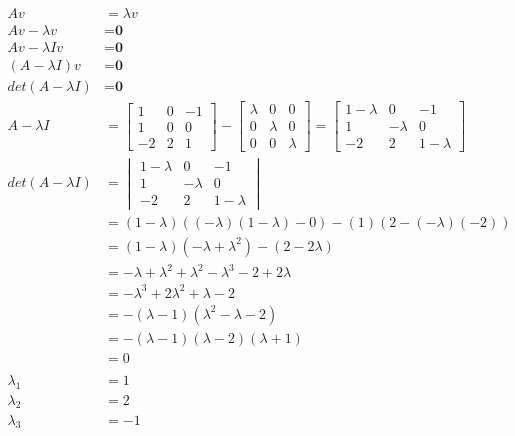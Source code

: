 \documentclass[12pt, border = 4pt, multi]{article} %
\begin{document}
\begin{align*}
Av &= \lambda v\\
Av - \lambda v &= \textbf{0}\\
Av - \lambda I v &= \textbf{0}\\
(A - \lambda I)v &= \textbf{0}\\
det(A - \lambda I) &= \textbf{0}\\
A - \lambda I &=
\begin{bmatrix}
1 & 0 & -1\\ 
1 & 0 & 0\\
-2 & 2 & 1
\end{bmatrix}
-
\begin{bmatrix}
\lambda & 0 & 0\\
0 & \lambda & 0\\
0 & 0 & \lambda
\end{bmatrix}
=
\begin{bmatrix}
1 - \lambda & 0 & -1\\ 
1 & -\lambda & 0\\
-2 & 2 & 1 - \lambda
\end{bmatrix}\\
det(A - \lambda I) &=
\begin{vmatrix}
1 - \lambda & 0 & -1\\ 
1 & -\lambda & 0\\
-2 & 2 & 1 - \lambda
\end{vmatrix}\\
&= (1 - \lambda)((-\lambda)(1 - \lambda) - 0) - (1)(2 - (-\lambda)(-2))\\
&= (1 - \lambda)(-\lambda + \lambda ^ 2) - (2 - 2\lambda)\\
&= -\lambda + \lambda ^ 2 + \lambda ^ 2 - \lambda ^ 3 - 2 + 2\lambda\\
&= -\lambda ^ 3 + 2\lambda ^ 2 + \lambda - 2\\
&= -(\lambda - 1)(\lambda ^ 2 - \lambda - 2)\\
&= -(\lambda - 1)(\lambda - 2)(\lambda + 1)\\
&= 0\\
\\
\lambda_1 &= 1\\
\lambda_2 &= 2\\
\lambda_3 &= -1\\
\end{align*}
\end{document}
